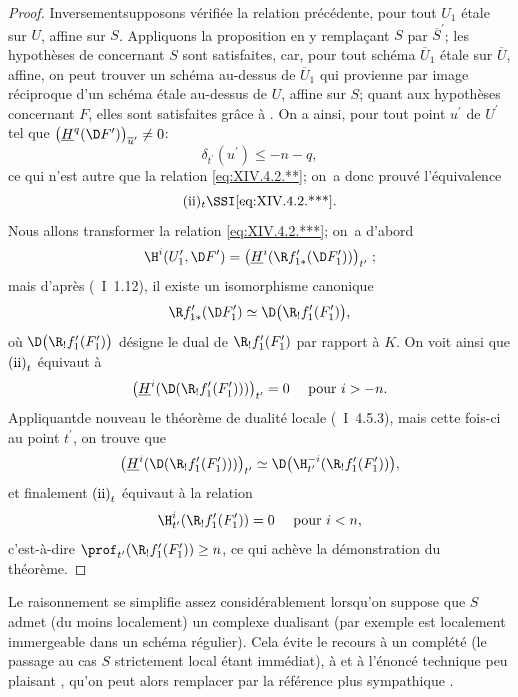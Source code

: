\begin{proof}
Inversement\pageoriginale supposons v\'erifi\'ee la relation pr\'ec\'edente, pour tout $U_{1}$ \'etale sur $U$, affine sur $S$. Appliquons la proposition  en y rempla\c cant $S$ par $\overline{S}^{\prime}$; les hypoth\`eses de  concernant $S$ sont satisfaites, car, pour tout sch\'ema $\overline{U}_{1}$ \'etale sur $\overline{U}$, affine, on peut trouver un sch\'ema au-dessus de $\overline{U}_{1}$ qui provienne par image r\'eciproque d'un sch\'ema \'etale au-dessus de $U$, affine sur $S$; quant aux hypoth\`eses concernant $F$, elles sont satisfaites gr\^ace \`a . On a ainsi, pour tout point $u^{\prime}$ de $U^{\prime}$ tel que $\big(\underline{H}^{q}(\D F^{\prime})\big)_{\overline{u}^{\prime}}\neq 0$:
$$
\delta_{t^{\prime}}(u^{\prime})\leq -n-q,
$$
ce qui n'est autre que la relation \eqref{eq:XIV.4.2.**}; on~a donc prouv\'e l'\'equivalence
$$
\text{\textup{(ii)}$_{t}$\SSI\eqref{eq:XIV.4.2.***}}.
$$
Nous allons transformer la relation \eqref{eq:XIV.4.2.***}; on~a d'abord
$$
\H^{i}(U_{1}^{\prime}, \D F^{\prime})=\big(\underline{H}^{i}(\R f_{1\ast}^{\prime}(\D F_{1}^{\prime}))\big)_{t^{\prime}}\;;$$
mais d'apr\`es (~I~1.12), il existe un isomorphisme canonique
$$
\R f_{1\ast}^{\prime}(\D F_{1}^{\prime})\simeq\D\big(\R_{!}f_{1}^{\prime}(F_{1}^{\prime})\big),
$$
o\`u $\D\big(\R_{!}f_{1}^{\prime}(F_{1}^{\prime})\big)$ d\'esigne le dual de $\R_{!}f_{1}^{\prime}(F_{1}^{\prime})$ par rapport \`a $K$. On voit ainsi que $\textup{(ii)}_{t}$ \'equivaut \`a
$$
\big(\underline{H}^{i}(\D(\R_{!}f_{1}^{\prime}(F_{1}^{\prime})))\big)_{t^{\prime}}=0\quad\textrm{ pour }i>-n.
$$
Appliquant\pageoriginale de nouveau le th\'eor\`eme de dualit\'e locale (~I~4.5.3), mais cette fois-ci au point $t^{\prime}$, on trouve que
$$
\big(\underline{H}^{i}(\D(\R_{!}f_{1}^{\prime}(F_{1}^{\prime})))\big)_{t^{\prime}}\simeq\D\big(\H_{t^{\prime}}^{-i}(\R_{!}f_{1}^{\prime}(F_{1}^{\prime}))\big),
$$
et finalement $\textup{(ii)}_{t}$ \'equivaut \`a la relation
$$
\H_{t^{\prime}}^{i}(\R_{!}f_{1}^{\prime}(F_{1}^{\prime}))=0\quad\textrm{ pour }i<n,
$$
c'est-\`a-dire $\prof_{t^{\prime}}(\R_{!}f_{1}^{\prime}(F_{1}^{\prime}))\geq n$, ce qui ach\`eve la d\'emonstration du th\'eor\`eme.
\skipqed
\end{proof}

\begin{subremarque} \label{XIV.4.2.3}
Le raisonnement se simplifie assez consid\'erablement lorsqu'on suppose que $S$ admet (du moins localement) un complexe dualisant (par exemple est localement immergeable dans un sch\'ema r\'egulier). Cela \'evite le recours \`a un compl\'et\'e (le passage au cas $S$ strictement local \'etant imm\'ediat), \`a  et \`a l'\'enonc\'e technique peu plaisant , qu'on peut alors remplacer par la r\'ef\'erence plus sympathique .
\end{subremarque}

